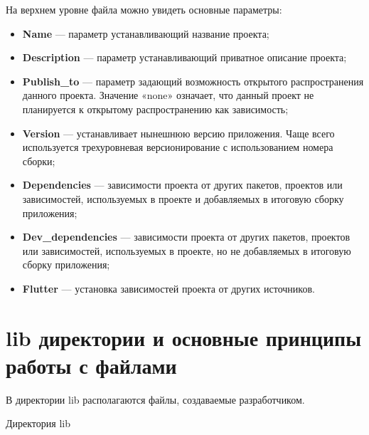 На верхнем уровне файла можно увидеть основные параметры:

\begin{itemize}
	\item \textbf{Name} --- параметр устанавливающий название проекта;
	\item \textbf{Description} --- параметр устанавливающий
		приватное описание проекта;
	\item \textbf{Publish\_to} --- параметр задающий возможность открытого
		распространения данного проекта. Значение «none» означает,
		что данный проект не планируется к открытому распространению
		как зависимость;
	\item \textbf{Version} --- устанавливает нынешнюю версию приложения.
		Чаще всего используется трехуровневая версионирование
		с использованием номера сборки;
	\item \textbf{Dependencies} --- зависимости проекта от других пакетов,
		проектов или зависимостей, используемых в проекте
		и добавляемых в итоговую сборку приложения;
	\item \textbf{Dev\_dependencies} --- зависимости проекта от других пакетов,
		проектов или зависимостей, используемых в проекте,
		но не добавляемых в итоговую сборку приложения;
	\item \textbf{Flutter} --- установка зависимостей проекта
		от других источников.
\end{itemize}

\clearpage
\section{lib директории и основные принципы работы с файлами}

В директории lib  располагаются файлы, создаваемые разработчиком.

\begin{image}
	\caption{Директория lib}
	\label{fig:lib}
\end{image}


